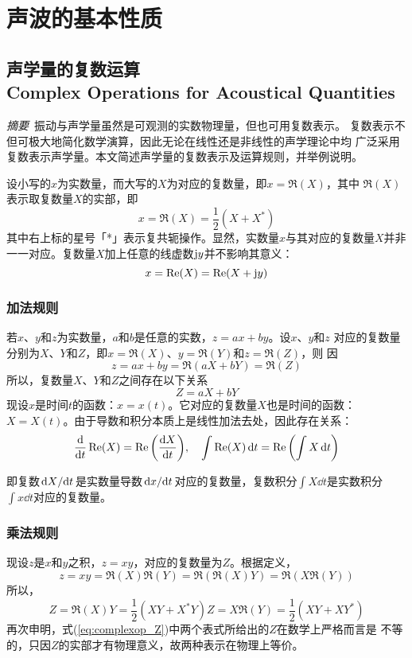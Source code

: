 \documentclass[UTF8]{ctexbook}
\let\stdsection\section
\renewcommand\section{\newpage\stdsection}
\begin{document}
\tableofcontents


\chapter{声波的基本性质}

\section{声学量的复数运算\\
Complex Operations for Acoustical Quantities}

\emph{摘要}\ 振动与声学量虽然是可观测的实数物理量，但也可用复数表示。
复数表示不但可极大地简化数学演算，因此无论在线性还是非线性的声学理论中均
广泛采用复数表示声学量。本文简述声学量的复数表示及运算规则，并举例说明。

设小写的$x$为实数量，而大写的$X$为对应的复数量，即$x=\Re(X)$，其中
$\Re(X)$表示取复数量$X$的实部，即
$$
x = \Re(X) = \frac12(X+X^*)
$$
其中右上标的星号「*」表示复共轭操作。显然，实数量$x$与其对应的复数量$X$并非
一一对应。复数量$X$加上任意的线虚数$\mathrm{j} y$并不影响其意义：
$$
x = \Re(X) = \Re(X+\mathrm{j} y)
$$

\subsection{加法规则}
若$x$、$y$和$z$为实数量，$a$和$b$是任意的实数，$z=ax+by$。设$x$、$y$和$z$
对应的复数量分别为$X$、$Y$和$Z$，即$x=\Re(X)$、$y=\Re(Y)$和$z=\Re(Z)$，则
因
$$
z = ax+by = \Re(aX+bY) = \Re(Z)
$$
所以，复数量$X$、$Y$和$Z$之间存在以下关系
$$Z=aX+bY$$
现设$x$是时间$t$的函数：$x=x(t)$。它对应的复数量$X$也是时间的函数：$X=
X(t)$。由于导数和积分本质上是线性加法去处，因此存在关系：
$$\dv{t} \Re(X) =\Re\qty(\dv{X}{t})\qc \int \Re(X) \dd{t} = \Re 
\qty(\int X\dd{t})$$

即复数$\dv*{X}{t}$是实数量导数$\dv*{x}{t}$对应的复数量，复数积分$\int X
\dd{t}$是实数积分$\int x\dd{t}$对应的复数量。

\subsection{乘法规则}
现设$z$是$x$和$y$之积，$z=xy$，对应的复数量为$Z$。根据定义，
$$z=xy =\Re(X)\Re(Y) = \Re(\Re(X)Y)=\Re(X\Re(Y))$$
所以，
\begin{subequations}
	\label{eq:complexop_Z}
	\begin{equation}Z= \Re(X)Y = \frac12 (XY+X^*Y)\end{equation}
	\begin{equation}Z=X\Re(Y) = \frac12 (XY+XY^*)\end{equation}
\end{subequations}
再次申明，式(\ref{eq:complexop_Z})中两个表式所给出的$Z$在数学上严格而言是
不等的，只因$Z$的实部才有物理意义，故两种表示在物理上等价。
\end{document}
